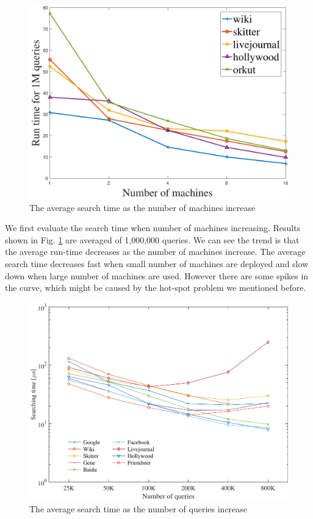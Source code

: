 \begin{figure}[t]
    \centering
    \includegraphics[width=\linewidth]{./figures/scale_machine.pdf}
    \caption{The average search time as the number of machines increase}
    \label{fig:scale_machine}
\end{figure}

We first evaluate the search time when number of machines increasing. Results shown in Fig. \ref{fig:scale_machine} are averaged of 1,000,000 queries. We can see the trend is that the average run-time decreases as the number of machines increase. The average search time decreases fast when small number of machines are deployed and slow down when large number of machines are used. However there are some spikes in the curve, which might be caused by the hot-spot problem we mentioned before.

\begin{figure}[t]
    \centering
    \includegraphics[width=\linewidth]{./figures/scale_query.pdf}
    \caption{The average search time as the number of queries increase}
    \label{fig:scale_query}
\end{figure}

